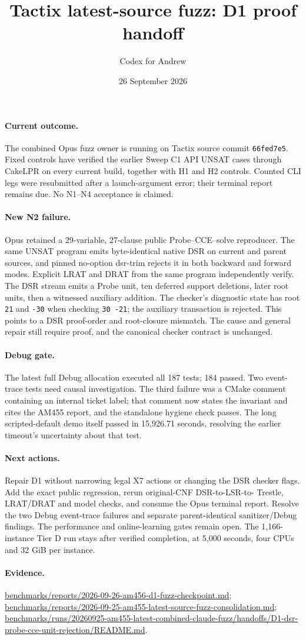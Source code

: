\documentclass[11pt]{article}
\title{Tactix latest-source fuzz: D1 proof handoff}
\author{Codex for Andrew}
\date{26 September 2026}
\begin{document}
\maketitle

\paragraph{Current outcome.}
The combined Opus fuzz owner is running on Tactix source commit
\texttt{66fed7e5}. Fixed controls have verified the earlier Sweep C1 API
UNSAT cases through CakeLPR on every current build, together with H1 and H2
controls. Counted CLI legs were resubmitted after a launch-argument error;
their terminal report remains due. No N1--N4 acceptance is claimed.

\paragraph{New N2 failure.}
Opus retained a 29-variable, 27-clause public Probe--CCE--solve reproducer.
The same UNSAT program emits byte-identical native DSR on current and parent
sources, and pinned no-option dsr-trim rejects it in both backward and forward
modes. Explicit LRAT and DRAT from the same program independently verify.
The DSR stream emits a Probe unit, ten deferred support deletions, later root
units, then a witnessed auxiliary addition. The checker's diagnostic state
has root \texttt{21} and \texttt{-30} when checking \texttt{30 -21}; the
auxiliary transaction is rejected. This points to a DSR proof-order and
root-closure mismatch. The cause and general repair still require proof, and
the canonical checker contract is unchanged.

\paragraph{Debug gate.}
The latest full Debug allocation executed all 187 tests; 184 passed. Two
event-trace tests need causal investigation. The third failure was a CMake
comment containing an internal ticket label; that comment now states the
invariant and cites the AM455 report, and the standalone hygiene check passes.
The long scripted-default demo itself passed in 15,926.71 seconds, resolving
the earlier timeout's uncertainty about that test.

\paragraph{Next actions.}
Repair D1 without narrowing legal X7 actions or changing the DSR checker
flags. Add the exact public regression, rerun original-CNF DSR-to-LSR-to-
Trestle, LRAT/DRAT and model checks, and consume the Opus terminal report.
Resolve the two Debug event-trace failures and separate parent-identical
sanitizer/Debug findings. The performance and online-learning gates remain
open. The 1,166-instance Tier D run stays after verified completion, at
5,000 seconds, four CPUs and 32 GiB per instance.

\paragraph{Evidence.}
\url{benchmarks/reports/2026-09-26-am456-d1-fuzz-checkpoint.md};
\url{benchmarks/reports/2026-09-25-am455-latest-source-fuzz-consolidation.md};
\url{benchmarks/runs/20260925-am455-latest-combined-claude-fuzz/handoffs/D1-dsr-probe-cce-unit-rejection/README.md}.
\end{document}

